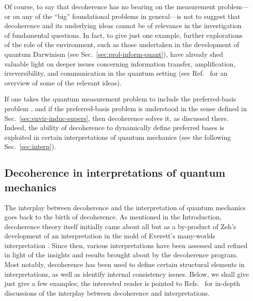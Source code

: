 \documentclass[3p,sort&compress]{elsarticle}
\begin{document}
Of course, to say that decoherence has no bearing on the measurement problem---or on any of the ``big'' foundational problems in general---is not to suggest that decoherence and its underlying ideas cannot be of relevance in the investigation of fundamental questions. In fact, to give just one example, further explorations of the role of the environment, such as those undertaken in the development of quantum Darwinism (see Sec.~\ref{sec:prol-inform-quant}), have already shed valuable light on deeper issues concerning information transfer, amplification, irreversibility, and communication in the quantum setting \cite{Zurek:2003:pl,Ollivier:2003:za,Ollivier:2004:im,Blume:2004:oo,Blume:2005:oo,Zurek:2009:om,Riedel:2010:un,Riedel:2011:un,Riedel:2012:un,Streltsov:2013:oo,Zurek:2013:xx,Zurek:2018:om,Zurek:2018:on} (see Ref.~\cite{Zurek:2009:om} for an overview of some of the relevant ideas).
 
If one takes the quantum measurement problem to include the preferred-basis problem \cite{Schlosshauer:2007:un}, and if the preferred-basis problem is understood in the sense defined in Sec.~\ref{sec:envir-induc-supers}, then decoherence solves it, as discussed there. Indeed, the ability of decoherence to dynamically define preferred bases is exploited in certain interpretations of quantum mechanics (see the following Sec.~\ref{sec:interp}). 

\subsection{Decoherence in interpretations of quantum mechanics\label{sec:interp}}

The interplay between decoherence and the interpretation of quantum mechanics goes back to the birth of decoherence. As mentioned in the Introduction, decoherence theory itself initially came about all but as a by-product of Zeh's development of an interpretation in the mold of Everett's many-worlds interpretation \cite{Zeh:1970:yt}. Since then, various interpretations have been assessed and refined in light of the insights and results brought about by the decoherence program. Most notably, decoherence has been used to define certain structural elements in interpretations, as well as identify internal consistency issues. Below, we shall give just give a few examples; the interested reader is pointed to Refs.~\cite{Schlosshauer:2003:tv, Bacciagaluppi:2003:yz} for in-depth discussions of the interplay between decoherence and interpretations. 
\end{document}
